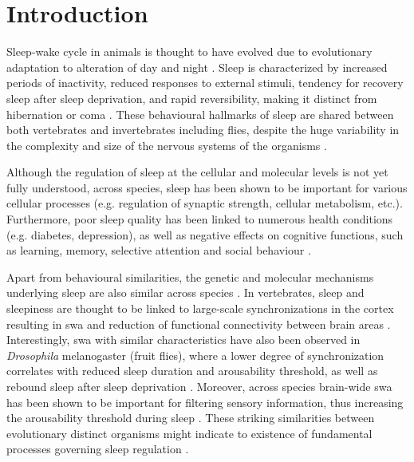 \documentclass[../main.tex]{subfiles}
\begin{document}
\section{Introduction} \label{sec:introduction}

Sleep-wake cycle in animals is thought to have evolved due to evolutionary
adaptation to alteration of day and night \parencite{suarez-grimaltNeuralArchitectureSleep2021}.
Sleep is characterized by increased periods of inactivity, reduced responses to external stimuli,
tendency for recovery sleep after sleep deprivation, and rapid reversibility, making it
distinct from hibernation or coma
\parencite{shaferRegulationDrosophilaSleep2021,andreaniCircadianProgrammingEllipsoid2022,donleaRecurrentCircuitryBalancing2018}.
These behavioural hallmarks of sleep are shared between both vertebrates and invertebrates
including flies,
despite the huge variability in the complexity and size of the nervous systems of the organisms
\parencite{shaferRegulationDrosophilaSleep2021,andreaniCircadianProgrammingEllipsoid2022}.

Although the regulation of sleep at the cellular and molecular levels is not yet fully understood, across species, sleep has been shown to be important for various cellular processes (e.g. regulation of synaptic strength, cellular metabolism, etc.). Furthermore, poor sleep quality has been linked to numerous health conditions (e.g. diabetes, depression), as well as negative effects on cognitive functions, such as learning, memory, selective attention and social behaviour \parencite{shaferRegulationDrosophilaSleep2021,dubowyCircadianRhythmsSleep2017,suarez-grimaltNeuralArchitectureSleep2021}.

Apart from behavioural similarities, the genetic and molecular mechanisms underlying
sleep are also similar across species \parencite{dubowyCircadianRhythmsSleep2017}.
In vertebrates, sleep and sleepiness are thought to be linked to large-scale synchronizations in the cortex resulting in \gls{swa} and reduction of functional connectivity between brain areas \parencite{suarez-grimaltNeuralArchitectureSleep2021,raccugliaNetworkSpecificSynchronizationElectrical2019}.
Interestingly, \gls{swa} with similar characteristics have also been observed in \textit{Drosophila} melanogaster (fruit flies), where a lower degree of synchronization correlates with reduced sleep duration and arousability
threshold, as well as rebound sleep after sleep deprivation
\parencite{raccugliaNetworkSpecificSynchronizationElectrical2019}. Moreover, across species brain-wide
\gls{swa} has been shown to be important for filtering sensory information, thus increasing the
arousability threshold during sleep \parencite{raccugliaCoherentMultilevelNetwork2022}. These
striking similarities between evolutionary distinct organisms might indicate to existence of
fundamental processes governing sleep regulation \parencite{suarez-grimaltNeuralArchitectureSleep2021}.
\end{document}
